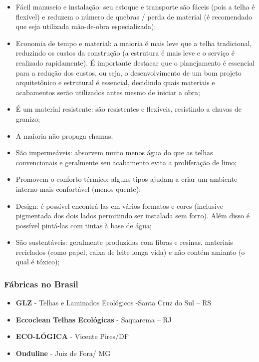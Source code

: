 	\begin{itemize}

		\item Fácil manuseio e instalação: seu estoque e transporte são fáceis (pois a telha é flexível) e reduzem o número de quebras / perda de material (é recomendado que seja utilizada mão-de-obra especializada);
		\item Economia de tempo e material: a maioria é mais leve que a telha tradicional, reduzindo os custos da construção (a estrutura é mais leve e o serviço é realizado rapidamente). É importante destacar que o planejamento é essencial para a redução dos custos, ou seja, o desenvolvimento de um bom projeto arquitetônico e estrutural é essencial, decidindo quais materiais e acabamentos serão utilizados antes mesmo de iniciar a obra;
		\item É um material resistente: são resistentes e flexíveis, resistindo a chuvas de granizo;
		\item A maioria não propaga chamas;
		\item São impermeáveis: absorvem muito menos água do que as telhas convencionais e geralmente seu acabamento evita a proliferação de limo;
		\item Promovem o conforto térmico: alguns tipos ajudam a criar um ambiente interno mais confortável (menos quente);
		\item Design: é possível encontrá-las em vários formatos e cores (inclusive pigmentada dos dois lados permitindo ser instalada sem forro). Além disso é possível pintá-las com tintas à base de água;
		\item São sustentáveis: geralmente produzidas com fibras e resinas, materiais reciclados (como papel, caixa de leite longa vida) e não contém amianto (o qual é tóxico);
	
	\end{itemize}

\subsubsection*{\textbf{Fábricas no Brasil}}
	
	\begin{itemize}
	
		\item \textbf{GLZ} - Telhas e Laminados Ecológicos -Santa Cruz do Sul – RS
		\item \textbf{Eccoclean Telhas Ecológicas} - Saquarema – RJ
		\item \textbf{ECO-LÓGICA} - Vicente Pires/DF
		\item \textbf{Onduline} - Juiz de Fora/ MG
	\end{itemize}

